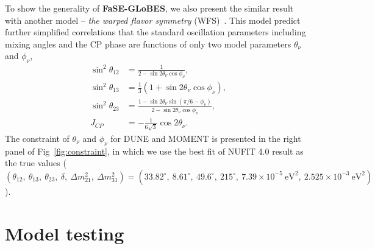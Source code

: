 \documentclass[aps,prd,nofootinbib,preprint]{revtex4}
\begin{document}
{\color{red}To show the generality of \textbf{FaSE-GLoBES}, we also present the similar result with another model -- \textit{the warped flavor symmetry} (WFS)~\cite{Chen:2015jta}. This model predict further simplified correlations that the standard oscillation parameters including mixing angles and the CP phase are functions of only two model parameters $\theta_\nu$ and $\phi_\nu$,
\begin{align}
\sin^2\theta_{12}&=\frac{1}{2-\sin2\theta_{\nu}\cos\phi_\nu},\nonumber\\
\sin^2\theta_{13}&=\frac{1}{3}(1+\sin2\theta_\nu\cos\phi_\nu),\nonumber\\
\sin^2\theta_{23}&=\frac{1-\sin2\theta_\nu\sin(\pi/6-\phi_\nu)}{2-\sin2\theta_\nu\cos\phi_\nu},\nonumber\\
J_{CP}&=-\frac{1}{6\sqrt{3}}\cos2\theta_\nu.
\end{align}
The constraint of $\theta_\nu$ and $\phi_\nu$ for DUNE and MOMENT is presented in the right panel of Fig~\ref{fig:constraint}, in which we use the best fit of NUFIT 4.0 result as the true values ($(\theta_{12},~\theta_{13},~\theta_{23},~\delta,~\Delta m_{21}^2,~\Delta m_{31}^2)=(33.82^\circ,~8.61^\circ,~49.6^\circ,~215^\circ,~7.39\times10^{-5}~\text{eV}^2,~2.525\times10^{-3}~\text{eV}^2)$).}


\section{Model testing}
\end{document}
